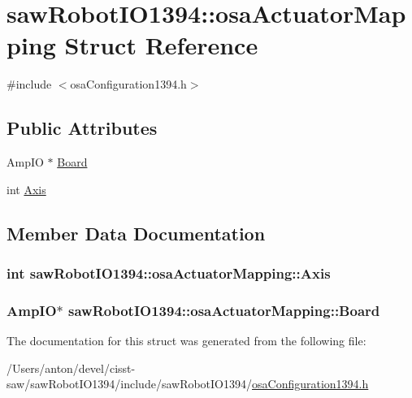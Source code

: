 \hypertarget{structsaw_robot_i_o1394_1_1osa_actuator_mapping}{}\section{saw\+Robot\+I\+O1394\+:\+:osa\+Actuator\+Mapping Struct Reference}
\label{structsaw_robot_i_o1394_1_1osa_actuator_mapping}


{\ttfamily \#include $<$osa\+Configuration1394.\+h$>$}

\subsection*{Public Attributes}
\begin{DoxyCompactItemize}
\item 
Amp\+I\+O $\ast$ \hyperlink{structsaw_robot_i_o1394_1_1osa_actuator_mapping_a46217ef1c3c396fdff23c6ecae8882ee}{Board}
\item 
int \hyperlink{structsaw_robot_i_o1394_1_1osa_actuator_mapping_aaa80a5cc2889109698ba033f0bbc39c5}{Axis}
\end{DoxyCompactItemize}


\subsection{Member Data Documentation}
\hypertarget{structsaw_robot_i_o1394_1_1osa_actuator_mapping_aaa80a5cc2889109698ba033f0bbc39c5}{}
\subsubsection[{Axis}]{\setlength{\rightskip}{0pt plus 5cm}int saw\+Robot\+I\+O1394\+::osa\+Actuator\+Mapping\+::\+Axis}\label{structsaw_robot_i_o1394_1_1osa_actuator_mapping_aaa80a5cc2889109698ba033f0bbc39c5}
\hypertarget{structsaw_robot_i_o1394_1_1osa_actuator_mapping_a46217ef1c3c396fdff23c6ecae8882ee}{}
\subsubsection[{Board}]{\setlength{\rightskip}{0pt plus 5cm}Amp\+I\+O$\ast$ saw\+Robot\+I\+O1394\+::osa\+Actuator\+Mapping\+::\+Board}\label{structsaw_robot_i_o1394_1_1osa_actuator_mapping_a46217ef1c3c396fdff23c6ecae8882ee}


The documentation for this struct was generated from the following file\+:\begin{DoxyCompactItemize}
\item 
/\+Users/anton/devel/cisst-\/saw/saw\+Robot\+I\+O1394/include/saw\+Robot\+I\+O1394/\hyperlink{osa_configuration1394_8h}{osa\+Configuration1394.\+h}\end{DoxyCompactItemize}
